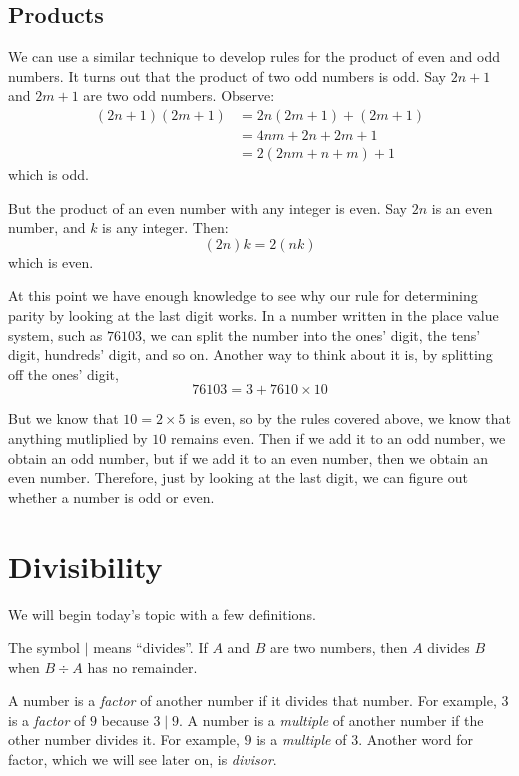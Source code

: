 \documentclass[a4paper,10pt]{report}
\begin{document}
\subsection{Products}

We can use a similar technique to develop rules for the product of even and odd
numbers. It turns out that the product of two odd numbers is odd. Say $2n+1$
and $2m+1$ are two odd numbers. Observe: \begin{align*}
 (2n+1)(2m+1)
 &= 2n(2m+1) + (2m+1) \\
 &= 4nm+2n+2m+1 \\
 &= 2(2nm+n+m) + 1
\end{align*} which is odd.

But the product of an even number with any integer is even. Say $2n$ is an
even number, and $k$ is any integer. Then: \[
 (2n)k = 2(nk)
\] which is even.

At this point we have enough knowledge to see why our rule for determining
parity by looking at the last digit works. In a number written in the place
value system, such as $76103$, we can split the number into the ones' digit,
the tens' digit, hundreds' digit, and so on. Another way to think about it is,
by splitting off the ones' digit, \[
 76103 = 3 + 7610 \times 10
\]

But we know that $10=2\times5$ is even, so by the rules covered above, we know
that anything mutliplied by $10$ remains even. Then if we add it to an odd
number, we obtain an odd number, but if we add it to an even number, then we
obtain an even number. Therefore, just by looking at the last digit, we can
figure out whether a number is odd or even.

\section{Divisibility}

We will begin today's topic with a few definitions.

The symbol $\mid$ means ``divides''. If $A$ and $B$ are two numbers, then $A$
divides $B$ when $B \div A$ has no remainder.

A number is a \emph{factor} of another number if it divides that number. For
example, $3$ is a \emph{factor} of $9$ because $3 \mid 9$. A number is a
\emph{multiple} of another number if the other number divides it. For example,
$9$ is a \emph{multiple} of $3$. Another word for factor, which we will see
later on, is \emph{divisor}.
\end{document}
